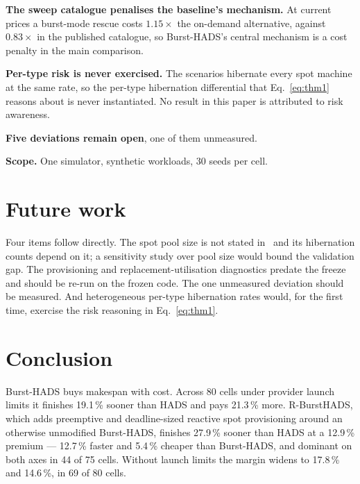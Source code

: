 \documentclass[conference]{IEEEtran}
\begin{document}
\textbf{The sweep catalogue penalises the baseline's mechanism.} At current
prices a burst-mode rescue costs $1.15\times$ the on-demand alternative, against
$0.83\times$ in the published catalogue, so Burst-HADS's central mechanism is a
cost penalty in the main comparison.

\textbf{Per-type risk is never exercised.} The scenarios hibernate every spot
machine at the same rate, so the per-type hibernation differential that
Eq.~\eqref{eq:thm1} reasons about is never instantiated. No result in this paper
is attributed to risk awareness.

\textbf{Five deviations remain open}, one of them unmeasured.

\textbf{Scope.} One simulator, synthetic workloads, 30 seeds per cell.

\section{Future work}

Four items follow directly. The spot pool size is not stated
in~\cite{teylo2023} and its hibernation counts depend on it; a sensitivity study
over pool size would bound the validation gap. The provisioning and
replacement-utilisation diagnostics predate the freeze and should be re-run on
the frozen code. The one unmeasured deviation should be measured. And
heterogeneous per-type hibernation rates would, for the first time, exercise the
risk reasoning in Eq.~\eqref{eq:thm1}.

\section{Conclusion}

Burst-HADS buys makespan with cost. Across 80 cells under provider launch
limits it finishes 19.1\,\% sooner than HADS and pays 21.3\,\% more.
R-BurstHADS, which adds preemptive and deadline-sized reactive spot provisioning
around an otherwise unmodified Burst-HADS, finishes 27.9\,\% sooner than HADS at
a 12.9\,\% premium --- 12.7\,\% faster and 5.4\,\% cheaper than Burst-HADS, and
dominant on both axes in 44 of 75 cells. Without launch limits the margin widens
to 17.8\,\% and 14.6\,\%, in 69 of 80 cells.
\end{document}
